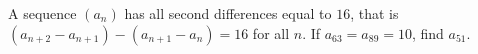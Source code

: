A sequence $(a_n)$ has all second differences equal to $16$, that is $(a_{n+2}-a_{n+1})-(a_{n+1}-a_n)=16$ for all $n$. If $a_{63}=a_{89}=10$, find $a_{51}$.
